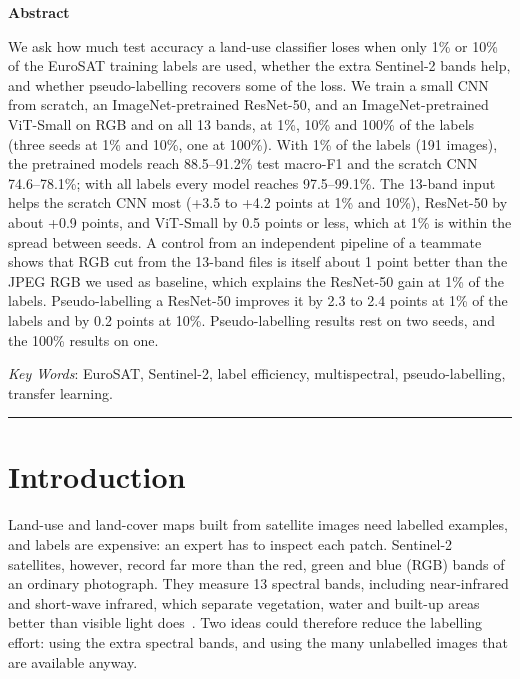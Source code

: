 \documentclass[twoside,a4paper,11pt]{article}
\begin{document}
\begin{center}
{\small\bfseries Abstract}
\end{center}
{\small
\begin{list}{}{\setlength{\leftmargin}{1cm}\setlength{\rightmargin}{1cm}\setlength{\topsep}{2pt}\setlength{\parsep}{0pt}}
\item[] We ask how much test accuracy a land-use classifier loses when only 1\% or 10\% of the EuroSAT training labels are used, whether the extra Sentinel-2 bands help, and whether pseudo-labelling recovers some of the loss. We train a small CNN from scratch, an ImageNet-pretrained ResNet-50, and an ImageNet-pretrained ViT-Small on RGB and on all 13 bands, at 1\%, 10\% and 100\% of the labels (three seeds at 1\% and 10\%, one at 100\%). With 1\% of the labels (191 images), the pretrained models reach 88.5--91.2\% test macro-F1 and the scratch CNN 74.6--78.1\%; with all labels every model reaches 97.5--99.1\%. The 13-band input helps the scratch CNN most (+3.5 to +4.2 points at 1\% and 10\%), ResNet-50 by about +0.9 points, and ViT-Small by 0.5 points or less, which at 1\% is within the spread between seeds. A control from an independent pipeline of a teammate shows that RGB cut from the 13-band files is itself about 1 point better than the JPEG RGB we used as baseline, which explains the ResNet-50 gain at 1\% of the labels. Pseudo-labelling a ResNet-50 improves it by 2.3 to 2.4 points at 1\% of the labels and by 0.2 points at 10\%. Pseudo-labelling results rest on two seeds, and the 100\% results on one.
\end{list}
\vspace{6pt}
\noindent\hspace{1cm}\textit{Key Words}: EuroSAT, Sentinel-2, label efficiency, multispectral, pseudo-labelling, transfer learning.\par
}
\vspace{8pt}
\noindent\rule{\textwidth}{0.4pt}

\section{Introduction}
Land-use and land-cover maps built from satellite images need labelled examples, and labels are expensive: an expert has to inspect each patch. Sentinel-2 satellites, however, record far more than the red, green and blue (RGB) bands of an ordinary photograph. They measure 13 spectral bands, including near-infrared and short-wave infrared, which separate vegetation, water and built-up areas better than visible light does~\cite{drusch2012sentinel}. Two ideas could therefore reduce the labelling effort: using the extra spectral bands, and using the many unlabelled images that are available anyway.
\end{document}
